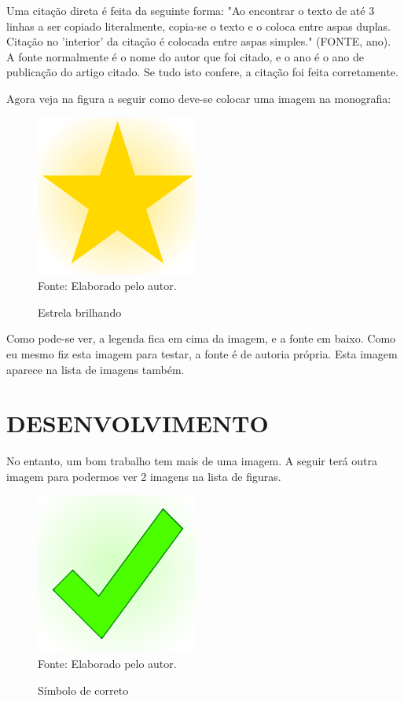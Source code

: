 \documentclass[12pt,a4paper]{article}
\newcommand{\source}[1]{Fonte: {#1}}
\begin{document}
	Uma citação direta é feita da seguinte forma:
	"Ao encontrar o texto de até 3 linhas a ser copiado literalmente, copia-se o texto e o coloca entre aspas duplas. Citação no 'interior' da citação é colocada entre aspas simples." (FONTE, ano).
	A fonte normalmente é o nome do autor que foi citado, e o ano é o ano de publicação do artigo citado.
	Se tudo isto confere, a citação foi feita corretamente.
	
	Agora veja na figura a seguir como deve-se colocar uma imagem na monografia:
	
\begin{figure}[ht!]
	\label{estrela}
	\caption{Estrela brilhando}
	\centering
	\vspace{3mm}
	\includegraphics[scale=0.5]{Star.png}\\
	\vspace{3mm}
	\source{Elaborado pelo autor.}
\end{figure}

	Como pode-se ver, a legenda fica em cima da imagem, e a fonte em baixo.
	Como eu mesmo fiz esta imagem para testar, a fonte é de autoria própria.
	Esta imagem aparece na lista de imagens também.

\clearpage %
\section{DESENVOLVIMENTO}
	No entanto, um bom trabalho tem mais de uma imagem.
	A seguir terá outra imagem para podermos ver 2 imagens na lista de figuras.

\begin{figure}[ht!]
	\label{correto}
	\caption{Símbolo de correto}
	\centering
	\vspace{3mm}
	\includegraphics[scale=0.5]{Okay.png}\\
	\vspace{3mm}
	\source{Elaborado pelo autor.}
\end{figure}
\end{document}
